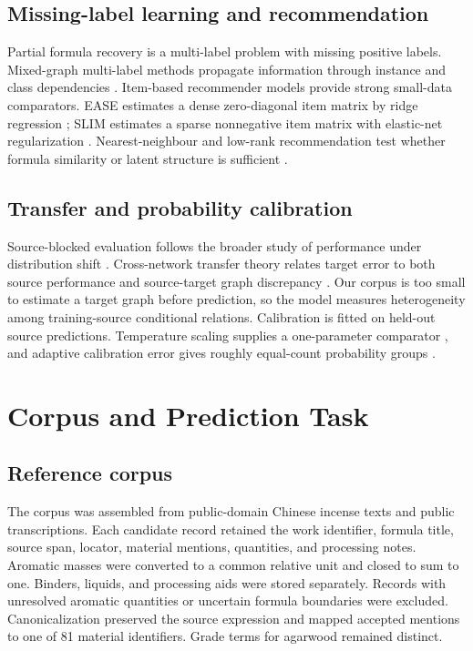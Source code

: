 \documentclass[11pt,a4paper]{article}
\begin{document}
\subsection{Missing-label learning and recommendation}

Partial formula recovery is a multi-label problem with missing positive labels. Mixed-graph multi-label methods propagate information through instance and class dependencies \citep{wu2015mlmg,zhao2018_bayesian_multilabel}. Item-based recommender models provide strong small-data comparators. EASE estimates a dense zero-diagonal item matrix by ridge regression \citep{steck2019ease}; SLIM estimates a sparse nonnegative item matrix with elastic-net regularization \citep{ning2011slim}. Nearest-neighbour and low-rank recommendation test whether formula similarity or latent structure is sufficient \citep{cover1967_nearest_neighbor,cremonesi2010_topn}.

\subsection{Transfer and probability calibration}

Source-blocked evaluation follows the broader study of performance under distribution shift \citep{koh2021_wilds}. Cross-network transfer theory relates target error to both source performance and source-target graph discrepancy \citep{wu2023noniid}. Our corpus is too small to estimate a target graph before prediction, so the model measures heterogeneity among training-source conditional relations. Calibration is fitted on held-out source predictions. Temperature scaling supplies a one-parameter comparator \citep{guo2017_calibration}, and adaptive calibration error gives roughly equal-count probability groups \citep{nixon2019calibration}.

\section{Corpus and Prediction Task}

\subsection{Reference corpus}

The corpus was assembled from public-domain Chinese incense texts and public transcriptions. Each candidate record retained the work identifier, formula title, source span, locator, material mentions, quantities, and processing notes. Aromatic masses were converted to a common relative unit and closed to sum to one. Binders, liquids, and processing aids were stored separately. Records with unresolved aromatic quantities or uncertain formula boundaries were excluded. Canonicalization preserved the source expression and mapped accepted mentions to one of 81 material identifiers. Grade terms for agarwood remained distinct.
\end{document}
